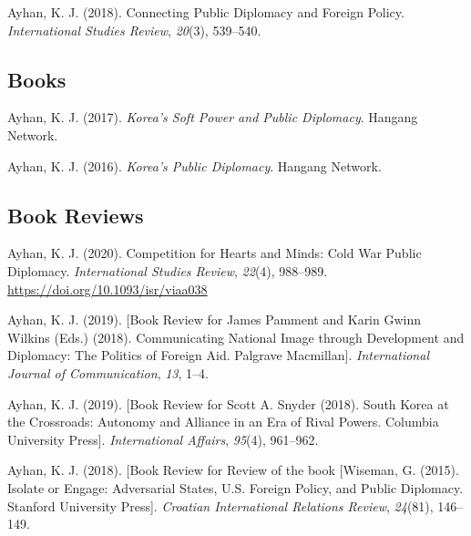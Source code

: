\documentclass[11pt,a4paper,]{awesome-cv}
\begin{document}
\leavevmode{}%
Ayhan, K. J. (2018). Connecting {Public} {Diplomacy} and {Foreign}
{Policy}. \emph{International Studies Review}, \emph{20}(3), 539--540.

\hypertarget{books}{%
\subsection{Books}\label{books}}

\hypertarget{refs_books}{}
\leavevmode{}%
Ayhan, K. J. (2017). \emph{Korea's {Soft} {Power} and {Public}
{Diplomacy}}. Hangang Network.

\leavevmode{}%
Ayhan, K. J. (2016). \emph{Korea's {Public} {Diplomacy}}. Hangang
Network.

\hypertarget{book-reviews}{%
\subsection{Book Reviews}\label{book-reviews}}

\hypertarget{refs_reviews}{}
\leavevmode{}%
Ayhan, K. J. (2020). Competition for {Hearts} and {Minds}: {Cold} {War}
{Public} {Diplomacy}. \emph{International Studies Review}, \emph{22}(4),
988--989. \url{https://doi.org/10.1093/isr/viaa038}

\leavevmode{}%
Ayhan, K. J. (2019). {[}{Book} {Review} for {James} {Pamment} and
{Karin} {Gwinn} {Wilkins} ({Eds}.) (2018). {Communicating} {National}
{Image} through {Development} and {Diplomacy}: {The} {Politics} of
{Foreign} {Aid}. {Palgrave} {Macmillan}{]}. \emph{International Journal
of Communication}, \emph{13}, 1--4.

\leavevmode{}%
Ayhan, K. J. (2019). {[}{Book} {Review} for {Scott} {A}. {Snyder}
(2018). {South} {Korea} at the {Crossroads}: {Autonomy} and {Alliance}
in an {Era} of {Rival} {Powers}. {Columbia} {University} {Press}{]}.
\emph{International Affairs}, \emph{95}(4), 961--962.

\leavevmode{}%
Ayhan, K. J. (2018). {[}{Book} {Review} for {Review} of the book
{[}{Wiseman}, {G}. (2015). {Isolate} or {Engage}: {Adversarial}
{States}, {U}.{S}. {Foreign} {Policy}, and {Public} {Diplomacy}.
{Stanford} {University} {Press}{]}. \emph{Croatian International
Relations Review}, \emph{24}(81), 146--149.
\end{document}
